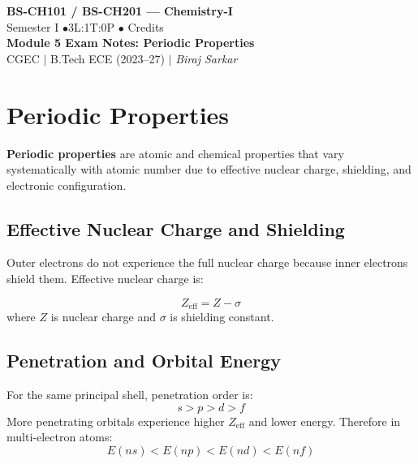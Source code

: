 \documentclass[12pt,a4paper]{article}
\begin{document}
\begin{center}
  {\LARGE\bfseries\color{myred} BS-CH101 / BS-CH201 --- Chemistry-I}\\[5pt]
  {\normalsize\color{mydark} Semester I \quad$\bullet$\quad 3L:1T:0P \quad$\bullet$ Credits}\\[3pt]
  {\normalsize\color{myteal}\textbf{Module 5 Exam Notes: Periodic Properties}}\\[3pt]
  {\small\color{mydark} CGEC \;$|$\; B.Tech ECE (2023--27) \;$|$\; \textit{Biraj Sarkar}}
\end{center}
\vspace{2pt}
\noindent{\color{myred}\rule{\linewidth}{1.5pt}}
\vspace{2pt}

\hypersetup{linkcolor=mydark}
\tableofcontents
\hypersetup{linkcolor=myteal}
\newpage
\section{Periodic Properties}

\begin{tcolorbox}[defbox]
\textbf{Periodic properties} are atomic and chemical properties that vary systematically with atomic number due to effective nuclear charge, shielding, and electronic configuration.
\end{tcolorbox}

\subsection{Effective Nuclear Charge and Shielding}
Outer electrons do not experience the full nuclear charge because inner electrons shield them. Effective nuclear charge is:

\begin{tcolorbox}[formulabox, title={Effective Nuclear Charge}]
\[
Z_{\mathrm{eff}}=Z-\sigma
\]
where $Z$ is nuclear charge and $\sigma$ is shielding constant.
\end{tcolorbox}

\subsection{Penetration and Orbital Energy}
For the same principal shell, penetration order is:
\[
s>p>d>f
\]
More penetrating orbitals experience higher $Z_{\mathrm{eff}}$ and lower energy. Therefore in multi-electron atoms:
\[
E(ns)<E(np)<E(nd)<E(nf)
\]
\end{document}
